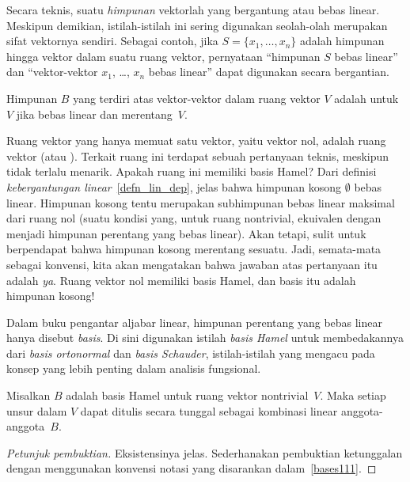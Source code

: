 Secara teknis, suatu \emph{himpunan} vektorlah yang bergantung atau bebas linear.
Meskipun demikian, istilah-istilah ini sering digunakan seolah-olah merupakan sifat vektornya
sendiri. Sebagai contoh, jika $S = \{x_1, \dots, x_n\}$ adalah himpunan hingga vektor dalam suatu
ruang vektor, pernyataan ``himpunan $S$ bebas linear'' dan
``vektor-vektor $x_1$, \dots, $x_n$ bebas linear'' dapat digunakan secara bergantian.

\begin{defn}\label{defn_Hamel_basis} Himpunan $B$ yang terdiri atas vektor-vektor dalam ruang vektor $V$ adalah
 untuk $V$ jika bebas linear dan merentang~$V$.
\end{defn}

\begin{conv}\label{conv_1_1} Ruang vektor yang hanya memuat satu vektor, yaitu vektor nol, adalah ruang vektor
 (atau
). Terkait ruang ini terdapat sebuah pertanyaan teknis, meskipun tidak terlalu menarik. Apakah ruang ini memiliki basis Hamel?
Dari definisi \emph{kebergantungan linear}~\ref{defn_lin_dep}, jelas bahwa himpunan kosong $\emptyset$ bebas
linear. Himpunan kosong tentu merupakan subhimpunan bebas linear maksimal dari ruang nol (suatu kondisi yang, untuk ruang nontrivial,
ekuivalen dengan menjadi himpunan perentang yang bebas linear). Akan tetapi, sulit untuk berpendapat bahwa himpunan kosong merentang sesuatu.
Jadi, semata-mata sebagai konvensi, kita akan mengatakan bahwa jawaban atas pertanyaan itu adalah \emph{ya}. Ruang vektor nol memiliki basis
Hamel, dan basis itu adalah himpunan kosong!
\end{conv}

Dalam buku pengantar aljabar linear, himpunan perentang yang bebas linear hanya disebut \emph{basis}. Di sini digunakan istilah \emph{basis Hamel}
untuk membedakannya dari \emph{basis ortonormal} dan \emph{basis Schauder}, istilah-istilah yang mengacu pada konsep yang lebih
penting dalam analisis fungsional.

\begin{prop} Misalkan $B$ adalah basis Hamel untuk ruang vektor nontrivial~$V$. Maka setiap unsur dalam $V$ dapat ditulis secara tunggal sebagai kombinasi
linear anggota-anggota~$B$.
\end{prop}

\begin{proof}[\emph{Petunjuk pembuktian}] Eksistensinya jelas. Sederhanakan pembuktian ketunggalan dengan menggunakan konvensi notasi
yang disarankan dalam~\ref{bases111}.   \ns
\end{proof}

